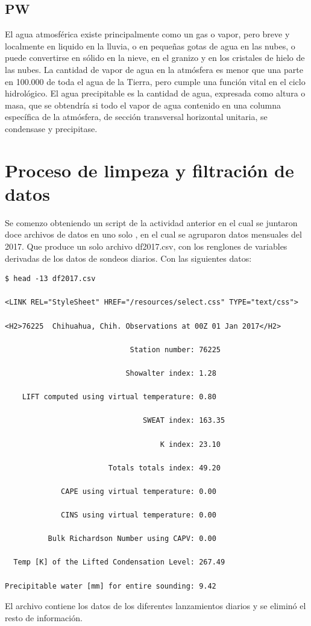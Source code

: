\documentclass{article}
\begin{document}
\subsection{PW}
El agua atmosférica existe principalmente como un gas o vapor, pero breve y localmente en liquido en la lluvia, o en pequeñas gotas de agua en las nubes, o puede convertirse en sólido en la nieve, en el granizo y en los cristales de hielo de las nubes. La cantidad de vapor de agua en la atmósfera es menor que una parte en 100.000 de toda el agua de la Tierra, pero cumple una función vital en el ciclo hidrológico.
\newline
El agua precipitable es la cantidad de agua, expresada como altura o masa, que se obtendría si todo el vapor de agua contenido en una columna específica de la atmósfera, de sección transversal horizontal unitaria, se condensase y precipitase.

\section{Proceso de limpeza y filtración de datos}
Se comenzo obteniendo un script de la actividad anterior en el cual se juntaron doce archivos de datos en uno solo , en el cual se agruparon datos mensuales del 2017.
\newline
Que produce un solo archivo df2017.csv, con los renglones de variables derivadas de los datos de sondeos diarios. Con las siguientes datos:
\begin{verbatim}
$ head -13 df2017.csv

<LINK REL="StyleSheet" HREF="/resources/select.css" TYPE="text/css">

<H2>76225  Chihuahua, Chih. Observations at 00Z 01 Jan 2017</H2>

                             Station number: 76225

                            Showalter index: 1.28

    LIFT computed using virtual temperature: 0.80

                                SWEAT index: 163.35

                                    K index: 23.10

                        Totals totals index: 49.20

             CAPE using virtual temperature: 0.00

             CINS using virtual temperature: 0.00

          Bulk Richardson Number using CAPV: 0.00

  Temp [K] of the Lifted Condensation Level: 267.49

Precipitable water [mm] for entire sounding: 9.42
\end{verbatim}
El archivo contiene los datos de los diferentes lanzamientos diarios y se eliminó el resto de información.
\end{document}

